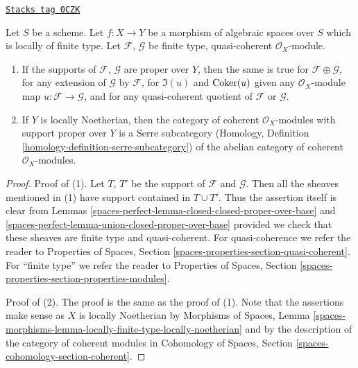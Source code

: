 \begin{lemma}
\label{spaces-perfect-lemma-cat-module-support-proper-over-base}
\href{https://stacks.math.columbia.edu/tag/0CZK}{\texttt{Stacks tag 0CZK}}

Let $S$ be a scheme.
Let $f : X \to Y$ be a morphism of algebraic spaces over $S$
which is locally of finite type. Let $\mathcal{F}$, $\mathcal{G}$
be finite type, quasi-coherent $\mathcal{O}_X$-module.
\begin{enumerate}
\item If the supports of $\mathcal{F}$, $\mathcal{G}$
are proper over $Y$, then the same is true
for $\mathcal{F} \oplus \mathcal{G}$, for any extension
of $\mathcal{G}$ by $\mathcal{F}$, for $\Im(u)$ and $\operatorname{Coker}(u)$
given any $\mathcal{O}_X$-module map $u : \mathcal{F} \to \mathcal{G}$,
and for any quasi-coherent quotient of $\mathcal{F}$ or $\mathcal{G}$.
\item If $Y$ is locally Noetherian, then the category of
coherent $\mathcal{O}_X$-modules with support proper over
$Y$ is a Serre subcategory (Homology, Definition
\ref{homology-definition-serre-subcategory})
of the abelian category of
coherent $\mathcal{O}_X$-modules.
\end{enumerate}
\end{lemma}

\begin{proof}
Proof of (1). Let $T$, $T'$ be the support of $\mathcal{F}$
and $\mathcal{G}$. Then all the sheaves mentioned in (1)
have support contained in $T \cup T'$. Thus the assertion itself
is clear from Lemmas \ref{spaces-perfect-lemma-closed-closed-proper-over-base} and
\ref{spaces-perfect-lemma-union-closed-proper-over-base}
provided we check that these sheaves are finite type
and quasi-coherent.
For quasi-coherence we refer the reader to
Properties of Spaces, Section \ref{spaces-properties-section-quasi-coherent}.
For ``finite type'' we refer the reader to
Properties of Spaces, Section
\ref{spaces-properties-section-properties-modules}.

\medskip\noindent
Proof of (2). The proof is the same as the proof of (1). Note that
the assertions make sense as $X$ is locally Noetherian by
Morphisms of Spaces, Lemma
\ref{spaces-morphisms-lemma-locally-finite-type-locally-noetherian}
and by the description of the category of coherent modules in
Cohomology of Spaces, Section \ref{spaces-cohomology-section-coherent}.
\end{proof}

